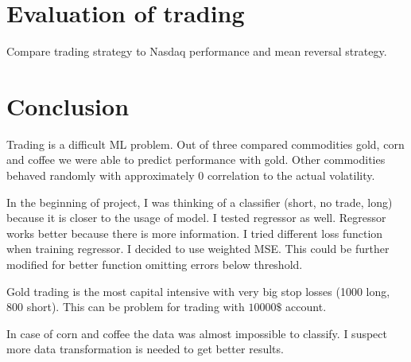 \documentclass[final,2p]{elsarticle}
\begin{document}
\section{Evaluation of trading}

Compare trading strategy to Nasdaq performance and mean reversal strategy.

\section{Conclusion}

Trading is a difficult ML problem. Out of three compared commodities gold, corn and coffee we were able to predict performance with gold. Other commodities behaved randomly with approximately 0 correlation to the actual volatility.

In the beginning of project, I was thinking of a classifier (short, no trade, long) because it is closer to the usage of model. I tested regressor as well. Regressor works better because there is more information. I tried different loss function when training regressor. I decided to use weighted MSE. This could be further modified for better function omitting errors below threshold.

Gold trading is the most capital intensive with very big stop losses (1000 long, 800 short). This can be problem for trading with $10 000\$$ account.

In case of corn and coffee the data was almost impossible to classify. I suspect more data transformation is needed to get better results.
\end{document}
